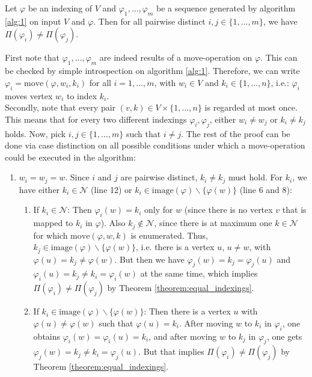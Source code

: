 \documentclass[11pt,a4paper]{article}
\numberwithin{equation}{section}
\newcommand{\idx}{\varphi}
\newcommand{\move}{\mathrm{move}}
\newcommand{\image}{\mathrm{image}}
\begin{document}
\begin{lemmarep}
    Let $\idx$ be an indexing of $V$ and $\idx_1,\dots,\idx_m$ be a sequence generated by algorithm \ref{alg:1} on input $V$ and $\idx$. Then for all pairwise distinct $i,j \in \{1,\dots,m\}$, we have $\Pi(\idx_i) \neq \Pi(\idx_j)$. \label{lemma:pairwise_distinctiveness}
\end{lemmarep}
\begin{appendixproof}
    First note that $\idx_1,\dots,\idx_m$ are indeed results of a move-operation on $\idx$. This can be checked by simple introspection on algorithm \ref{alg:1}. Therefore, we can write $\idx_i = \move(\idx,w_i,k_i)$ for all $i=1,\dots,m$, with $w_i \in V$ and $k_i \in \{1,\dots,n\}$, i.e.: $\idx_i$ moves vertex $w_i$ to index $k_i$. \\
    Secondly, note that every pair $(v,k) \in V \times \{1,\dots,n\}$ is regarded at most once. This means that for every two different indexings $\idx_i,\idx_j$, either $w_i \neq w_j$ or $k_i \neq k_j$ holds. Now, pick $i,j \in \{1,\dots,m\}$ such that $i \neq j$. The rest of the proof can be done via case distinction on all possible conditions under which a move-operation could be executed in the algorithm:
    \begin{enumerate}
        \item $w_i = w_j = w$. Since $i$ and $j$ are pairwise distinct, $k_i \neq k_j$ must hold. For $k_i$, we have either $k_i \in \mathcal{N}$ (line 12) or $k_i \in \image(\idx)\backslash \{ \idx(w) \}$ (line 6 and 8):
        \begin{enumerate}
            \item If $k_i \in \mathcal{N}$: Then $\idx_i(w) = k_i$ only for $w$ (since there is no vertex $v$ that is mapped to $k_i$ in $\idx$). Also $k_j \not\in \mathcal{N}$, since there is at maximum one $k \in \mathcal{N}$ for which $\move(\idx,w,k)$ is enumerated. Thus, $k_j \in \image(\idx)\backslash \{ \idx(w) \}$, i.e. there is a vertex $u$, $u\neq w$, with $\idx(u) = k_j \neq \idx(w)$. But then we have $\idx_j(w) = k_j =\idx_j(u)$ and $\idx_i(u) = k_j \neq k_i = \idx_i(w)$ at the same time, which implies $\Pi(\idx_i) \neq \Pi(\idx_j)$ by Theorem \ref{theorem:equal_indexings}.
            \item If $k_i \in \image(\idx)\backslash \{\idx(w) \}$: Then there is a vertex $u$ with $\idx(u) \neq \idx(w)$ such that $\idx(u) = k_i$. After moving $w$ to $k_i$ in $\idx_i$, one obtains $\idx_i(w) = \idx_i(u) = k_i$, and after moving $w$ to $k_j$ in $\idx_j$, one gets $\idx_j(w) = k_j \neq k_i = \idx_j(u)$. But that implies $\Pi(\idx_i) \neq \Pi(\idx_j)$ by Theorem \ref{theorem:equal_indexings}.  

\end{enumerate}
\end{enumerate}
\end{appendixproof}
\end{document}
